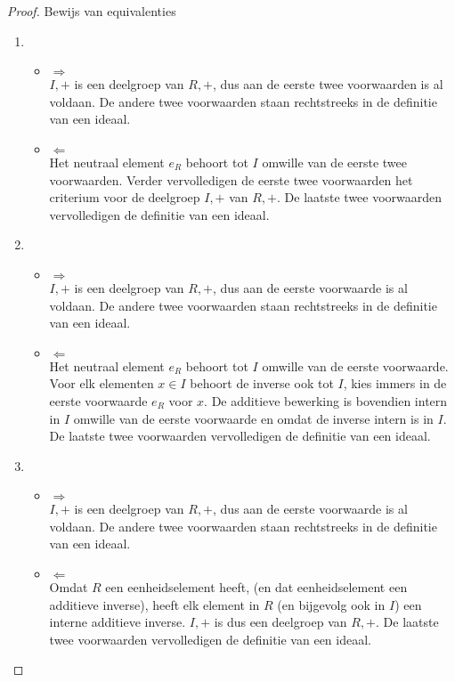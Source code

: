 \documentclass[main.tex]{subfiles}
\begin{document}
\begin{st}
  \begin{proof}
    Bewijs van equivalenties
    \begin{enumerate}
    \item
      \begin{itemize}
      \item $\Rightarrow$\\
        $I,+$ is een deelgroep van $R,+$, dus aan de eerste twee voorwaarden is al voldaan.
        De andere twee voorwaarden staan rechtstreeks in de definitie van een ideaal.
      \item $\Leftarrow$\\
        Het neutraal element $e_{R}$ behoort tot $I$ omwille van de eerste twee voorwaarden.
        Verder vervolledigen de eerste twee voorwaarden het criterium voor de deelgroep $I,+$ van $R,+$.
        De laatste twee voorwaarden vervolledigen de definitie van een ideaal.
      \end{itemize}
    \item 
      \begin{itemize}
      \item $\Rightarrow$\\
        $I,+$ is een deelgroep van $R,+$, dus aan de eerste voorwaarde is al voldaan.
        De andere twee voorwaarden staan rechtstreeks in de definitie van een ideaal.
      \item $\Leftarrow$\\
        Het neutraal element $e_{R}$ behoort tot $I$ omwille van de eerste voorwaarde.
        Voor elk elementen $x\in I$ behoort de inverse ook tot $I$, kies immers in de eerste voorwaarde $e_{R}$ voor $x$.
        De additieve bewerking is bovendien intern in $I$ omwille van de eerste voorwaarde en omdat de inverse intern is in $I$.
        De laatste twee voorwaarden vervolledigen de definitie van een ideaal.
      \end{itemize}
    \item 
      \begin{itemize}
      \item $\Rightarrow$\\
        $I,+$ is een deelgroep van $R,+$, dus aan de eerste voorwaarde is al voldaan.
        De andere twee voorwaarden staan rechtstreeks in de definitie van een ideaal.
      \item $\Leftarrow$\\
        Omdat $R$ een eenheidselement heeft, (en dat eenheidselement een additieve inverse), heeft elk element in $R$ (en bijgevolg ook in $I$) een interne additieve inverse.
        $I,+$ is dus een deelgroep van $R,+$.
        De laatste twee voorwaarden vervolledigen de definitie van een ideaal.
      \end{itemize}
    \end{enumerate}
  \end{proof}
\end{st}
\end{document}
